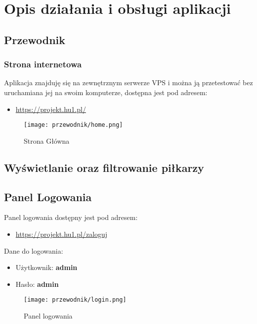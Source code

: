 \section{Opis działania i obsługi aplikacji}
    \subsection{Przewodnik}

        \subsubsection{Strona internetowa}
            Aplikacja znajduję się na zewnętrznym serwerze VPS i można ją przetestować bez uruchamiana jej na swoim komputerze, dostępna jest pod adresem:
            \begin{itemize}
                \item \url{https://projekt.hu1.pl/}
            \end{itemize}

            \begin{figure}[!htb]
                \centering
                \texttt{[image: przewodnik/home.png]}
                \caption{Strona Główna}                
            \end{figure}
    
        \subsection{Wyświetlanie oraz filtrowanie piłkarzy}
        
        \subsection{Panel Logowania}
            Panel logowania dostępny jest pod adresem:
            \begin{itemize}
                \item \url{https://projekt.hu1.pl/zaloguj}
            \end{itemize}

            Dane do logowania: 
            \begin{itemize}
                \item Użytkownik: \textbf{admin}
                \item Hasło: \textbf{admin}
            \end{itemize}

                \begin{figure}[!htb]
                    \centering
                    \texttt{[image: przewodnik/login.png]}
                    \caption{Panel logowania}                
                \end{figure}

